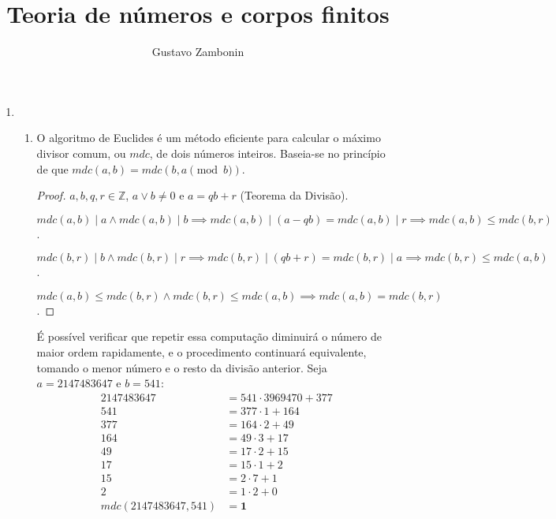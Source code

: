 \documentclass[fleqn]{../sftex/sftex}
\title{Teoria de números e corpos finitos}
\author{Gustavo Zambonin}
\begin{document}
\maketitle

\begin{enumerate}[label= (\textbf{\arabic*})]

\item

\begin{enumerate}

\item O algoritmo de Euclides é um método eficiente para calcular o máximo
divisor comum, ou $mdc$, de dois números inteiros. Baseia-se no princípio de
que $mdc(a, b) = mdc(b, a \pmod{b})$.

\begin{proof}
$a, b, q, r \in \mathbb{Z}$, $a \lor b \neq 0$ e $a = qb + r$
(Teorema da Divisão).

$mdc(a, b) \mid a \land mdc(a, b) \mid b
\implies mdc(a, b) \mid (a - qb) = mdc(a, b) \mid r
\implies mdc(a, b) \leq mdc(b, r)$.

$mdc(b, r) \mid b \land mdc(b, r) \mid r
\implies mdc(b, r) \mid (qb + r) = mdc(b, r) \mid a
\implies mdc(b, r) \leq mdc(a, b)$.

$mdc(a, b) \leq mdc(b, r) \land mdc(b, r) \leq mdc(a, b)
\implies mdc(a, b) = mdc(b, r)$.
\end{proof}
É possível verificar que repetir essa computação diminuirá o número de maior
ordem rapidamente, e o procedimento continuará equivalente, tomando o menor
número e o resto da divisão anterior. Seja $a = 2147483647$ e $b = 541$:
\begin{align*}
2147483647 &= 541 \cdot 3969470 + 377 \\
541 &= 377 \cdot 1 + 164 \\
377 &= 164 \cdot 2 + 49 \\
164 &= 49 \cdot 3 + 17 \\
49 &= 17 \cdot 2 + 15 \\
17 &= 15 \cdot 1 + 2 \\
15 &= 2 \cdot 7 + 1 \\
2 &= 1 \cdot 2 + 0 \\
mdc(2147483647, 541) &= \boldsymbol{1}
\end{align*}


\end{enumerate}
\end{enumerate}
\end{document}
